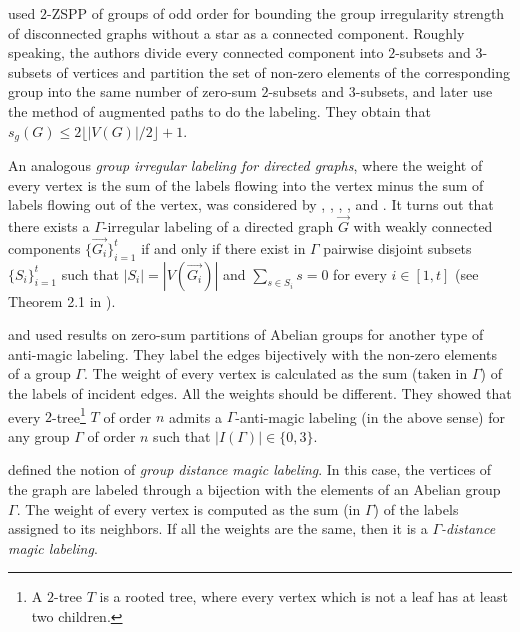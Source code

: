 \documentclass[final]{dmtcs-episciences}
\begin{document}
\citet{ref:AnhCic} used $2$-ZSPP of groups of odd order for bounding the group irregularity strength of disconnected graphs without a star as a connected component. Roughly speaking, the authors divide every connected component into $2$-subsets and $3$-subsets of vertices and partition the set of non-zero elements of the corresponding group into the same number of zero-sum $2$-subsets and $3$-subsets, and later use the method of augmented paths to do the labeling. They obtain that $s_g(G)\leq 2\lfloor|V(G)|/2\rfloor+1$.

An analogous \textit{group irregular labeling for directed graphs}, where the weight of every vertex is the sum of the labels flowing into the vertex minus the sum of labels flowing out of the vertex, was considered by \citet{ref:AigTri}, \citet{ref:CaccJia}, \citet{CicTuz}, \citet{Egawa}, \citet{Fukuchi} and \citet{Tuza}. It turns out that there exists a $\Gamma$-irregular labeling of a directed graph $\overrightarrow{G}$ with weakly connected components $\{\overrightarrow{G_i}\}_{i=1}^t$ if and only if there exist in $\Gamma$ pairwise disjoint subsets $\{S_i\}_{i=1}^t$ such that $|S_i|=|V(\overrightarrow{G_i})|$  and $\sum_{s\in S_i}s=0$ for every  {$i\in[1, t]$} {(see Theorem 2.1 in \citet{CicTuz})}.

\citet{KLR} and \citet{Zeng} used results on zero-sum partitions of Abelian groups for another type of anti-magic labeling. They label the edges bijectively with the non-zero elements of a group $\Gamma$. The weight of every vertex is calculated as the sum (taken in $\Gamma$) of the labels of incident edges. All the weights should be different. They showed that every $2$-tree\footnote{A $2$-tree $T$ is a rooted tree, where every vertex which is not a leaf has at least two children.} $T$ of order $n$ admits a $\Gamma$-anti-magic labeling (in the above sense) for any group $\Gamma$ of order $n$ such that $|I(\Gamma)|\in\{0,3\}$. 

\citet{Fro1} defined the notion of \textit{group distance magic labeling}. In this case, the vertices of the graph are labeled through a bijection with the elements of an Abelian group $\Gamma$. The weight of every vertex is computed as the sum (in $\Gamma$) of the labels assigned to its neighbors. If all the weights are the same, then it is a \textit{$\Gamma$-distance magic labeling}.
\end{document}
